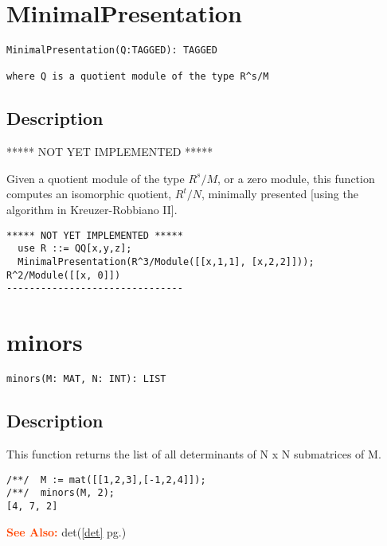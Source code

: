 \documentclass[a4paper]{mybook}
\newenvironment{command}{}{} %
\newcommand\SeeAlso{\par\textcolor{OrangeRed}{\textbf{\large See Also: }}}
\begin{document}
\section{MinimalPresentation}
\label{MinimalPresentation}
\begin{command} %


\begin{Verbatim}[label=syntax, rulecolor=\color{MidnightBlue},
frame=single]
MinimalPresentation(Q:TAGGED): TAGGED

where Q is a quotient module of the type R^s/M
\end{Verbatim}


\subsection*{Description}

***** NOT YET IMPLEMENTED *****
\par 
Given a quotient module of the type $R^{s}/M$,
or a zero module, this function computes an isomorphic quotient,
$R^{t}/N$, minimally presented
[using the algorithm in Kreuzer-Robbiano II].
\begin{Verbatim}[label=example, rulecolor=\color{PineGreen}, frame=single]
***** NOT YET IMPLEMENTED *****
  use R ::= QQ[x,y,z];
  MinimalPresentation(R^3/Module([[x,1,1], [x,2,2]]));
R^2/Module([[x, 0]])
-------------------------------
\end{Verbatim}


\end{command} %

\section{minors}
\label{minors}
\begin{command} %


\begin{Verbatim}[label=syntax, rulecolor=\color{MidnightBlue},
frame=single]
minors(M: MAT, N: INT): LIST
\end{Verbatim}


\subsection*{Description}

This function returns the list of all determinants of N x N
submatrices of M.
\begin{Verbatim}[label=example, rulecolor=\color{PineGreen}, frame=single]
/**/  M := mat([[1,2,3],[-1,2,4]]);
/**/  minors(M, 2);
[4, 7, 2]
\end{Verbatim}


\SeeAlso %
  det(\ref{det} pg.\pageref{det})
\end{command} %
\end{document}

